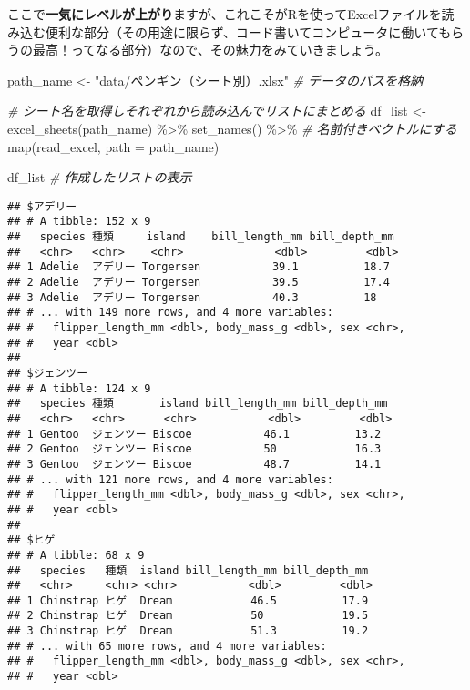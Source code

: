 \documentclass[
  xelatex,ja=standard, b5paper]{bxjsbook}
\newenvironment{Shaded}{\begin{snugshade}}{\end{snugshade}}
\newcommand{\AttributeTok}[1]{\textcolor[rgb]{0.77,0.63,0.00}{#1}}
\newcommand{\CommentTok}[1]{\textcolor[rgb]{0.56,0.35,0.01}{\textit{#1}}}
\newcommand{\FunctionTok}[1]{\textcolor[rgb]{0.00,0.00,0.00}{#1}}
\newcommand{\NormalTok}[1]{#1}
\newcommand{\OtherTok}[1]{\textcolor[rgb]{0.56,0.35,0.01}{#1}}
\newcommand{\SpecialCharTok}[1]{\textcolor[rgb]{0.00,0.00,0.00}{#1}}
\newcommand{\StringTok}[1]{\textcolor[rgb]{0.31,0.60,0.02}{#1}}
\begin{document}
ここで\textbf{一気にレベルが上がり}ますが、これこそがRを使ってExcelファイルを読み込む便利な部分（その用途に限らず、コード書いてコンピュータに働いてもらうの最高！ってなる部分）なので、その魅力をみていきましょう。

\begin{Shaded}
\begin{Highlighting}[]
\NormalTok{path\_name }\OtherTok{\textless{}{-}} \StringTok{"data/ペンギン（シート別）.xlsx"} \CommentTok{\# データのパスを格納}

\CommentTok{\# シート名を取得しそれぞれから読み込んでリストにまとめる}
\NormalTok{df\_list }\OtherTok{\textless{}{-}}
  \FunctionTok{excel\_sheets}\NormalTok{(path\_name) }\SpecialCharTok{\%\textgreater{}\%}                     
  \FunctionTok{set\_names}\NormalTok{() }\SpecialCharTok{\%\textgreater{}\%}           \CommentTok{\# 名前付きベクトルにする}
  \FunctionTok{map}\NormalTok{(read\_excel, }\AttributeTok{path =}\NormalTok{  path\_name)}

\NormalTok{df\_list }\CommentTok{\# 作成したリストの表示}
\end{Highlighting}
\end{Shaded}

\begin{verbatim}
## $アデリー
## # A tibble: 152 x 9
##   species 種類     island    bill_length_mm bill_depth_mm
##   <chr>   <chr>    <chr>              <dbl>         <dbl>
## 1 Adelie  アデリー Torgersen           39.1          18.7
## 2 Adelie  アデリー Torgersen           39.5          17.4
## 3 Adelie  アデリー Torgersen           40.3          18  
## # ... with 149 more rows, and 4 more variables:
## #   flipper_length_mm <dbl>, body_mass_g <dbl>, sex <chr>,
## #   year <dbl>
## 
## $ジェンツー
## # A tibble: 124 x 9
##   species 種類       island bill_length_mm bill_depth_mm
##   <chr>   <chr>      <chr>           <dbl>         <dbl>
## 1 Gentoo  ジェンツー Biscoe           46.1          13.2
## 2 Gentoo  ジェンツー Biscoe           50            16.3
## 3 Gentoo  ジェンツー Biscoe           48.7          14.1
## # ... with 121 more rows, and 4 more variables:
## #   flipper_length_mm <dbl>, body_mass_g <dbl>, sex <chr>,
## #   year <dbl>
## 
## $ヒゲ
## # A tibble: 68 x 9
##   species   種類  island bill_length_mm bill_depth_mm
##   <chr>     <chr> <chr>           <dbl>         <dbl>
## 1 Chinstrap ヒゲ  Dream            46.5          17.9
## 2 Chinstrap ヒゲ  Dream            50            19.5
## 3 Chinstrap ヒゲ  Dream            51.3          19.2
## # ... with 65 more rows, and 4 more variables:
## #   flipper_length_mm <dbl>, body_mass_g <dbl>, sex <chr>,
## #   year <dbl>
\end{verbatim}
\end{document}
